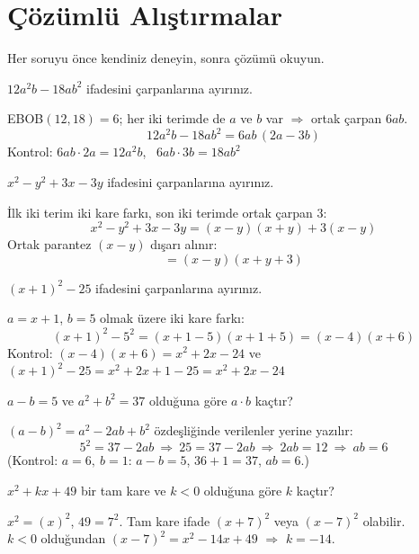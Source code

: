 \section{Çözümlü Alıştırmalar}
Her soruyu önce kendiniz deneyin, sonra çözümü okuyun.

\begin{alistirma}
\(12a^2b-18ab^2\) ifadesini çarpanlarına ayırınız.
\end{alistirma}
\begin{cozum}
EBOB\((12,18)=6\); her iki terimde de \(a\) ve \(b\) var \(\Rightarrow\) ortak çarpan \(6ab\).
\[12a^2b-18ab^2=6ab\,(2a-3b)\]
Kontrol: \(6ab\cdot 2a=12a^2b\), \ \(6ab\cdot 3b=18ab^2\) \checkmark
\end{cozum}

\begin{alistirma}
\(x^2-y^2+3x-3y\) ifadesini çarpanlarına ayırınız.
\end{alistirma}
\begin{cozum}
İlk iki terim iki kare farkı, son iki terimde ortak çarpan \(3\):
\[x^2-y^2+3x-3y=(x-y)(x+y)+3(x-y)\]
Ortak parantez \((x-y)\) dışarı alınır:
\[=(x-y)(x+y+3)\]
\end{cozum}

\begin{alistirma}
\((x+1)^2-25\) ifadesini çarpanlarına ayırınız.
\end{alistirma}
\begin{cozum}
\(a=x+1\), \(b=5\) olmak üzere iki kare farkı:
\[(x+1)^2-5^2=(x+1-5)(x+1+5)=(x-4)(x+6)\]
Kontrol: \((x-4)(x+6)=x^2+2x-24\) ve \((x+1)^2-25=x^2+2x+1-25=x^2+2x-24\) \checkmark
\end{cozum}

\begin{alistirma}
\(a-b=5\) ve \(a^2+b^2=37\) olduğuna göre \(a\cdot b\) kaçtır?
\end{alistirma}
\begin{cozum}
\((a-b)^2=a^2-2ab+b^2\) özdeşliğinde verilenler yerine yazılır:
\[5^2=37-2ab\ \Rightarrow\ 25=37-2ab\ \Rightarrow\ 2ab=12\ \Rightarrow\ ab=6\]
(Kontrol: \(a=6,\ b=1\): \(a-b=5\), \(36+1=37\), \(ab=6\).)
\end{cozum}

\begin{alistirma}
\(x^2+kx+49\) bir tam kare ve \(k<0\) olduğuna göre \(k\) kaçtır?
\end{alistirma}
\begin{cozum}
\(x^2=(x)^2\), \(49=7^2\). Tam kare ifade \((x+7)^2\) veya \((x-7)^2\) olabilir.\\
\(k<0\) olduğundan \((x-7)^2=x^2-14x+49\) \(\Rightarrow\) \(k=-14\).
\end{cozum}


